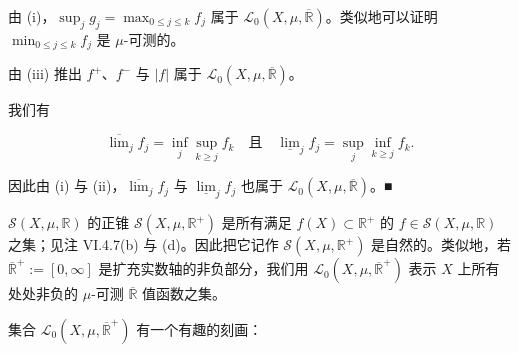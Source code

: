 \begin{proposition}
\begin{subitems}
由 (i)，$ \sup_j g_j = \max_{0 \le j \le k} f_j $ 属于 $ \mathcal{L}_0(X,\mu,\overline{\mathbb{R}}) $。类似地可以证明 $ \min_{0 \le j \le k} f_j $ 是 $ \mu $-可测的。

\item

由 (iii) 推出 $ f^{+} $、$ f^{-} $ 与 $ |f| $ 属于 $ \mathcal{L}_0(X,\mu,\overline{\mathbb{R}}) $。

\item

我们有

\[
\overline{\lim}_j f_j = \inf_j \sup_{k \ge j} f_k \quad \text{且} \quad \underline{\lim}_j f_j = \sup_j \inf_{k \ge j} f_k .
\]

因此由 (i) 与 (ii)，$ \overline{\lim}_j f_j $ 与 $ \underline{\lim}_j f_j $ 也属于 $ \mathcal{L}_0(X,\mu,\overline{\mathbb{R}}) $。\nobreak\hspace{0.35em}■

\end{subitems}

\end{proposition}

$ \mathcal{S}(X,\mu,\mathbb{R}) $ 的正锥 $ \mathcal{S}(X,\mu,\mathbb{R}^{+}) $ 是所有满足 $ f(X) \subset \mathbb{R}^{+} $ 的 $ f \in \mathcal{S}(X,\mu,\mathbb{R}) $ 之集；见注 VI.4.7(b) 与 (d)。因此把它记作 $ \mathcal{S}(X,\mu,\mathbb{R}^{+}) $ 是自然的。类似地，若 $ \overline{\mathbb{R}}^{+} := [0,\infty] $ 是扩充实数轴的非负部分，我们用 $ \mathcal{L}_0(X,\mu,\overline{\mathbb{R}}^{+}) $ 表示 $ X $ 上所有处处非负的 $ \mu $-可测 $ \overline{\mathbb{R}} $ 值函数之集。

集合 $ \mathcal{L}_0(X,\mu,\overline{\mathbb{R}}^{+}) $ 有一个有趣的刻画：

